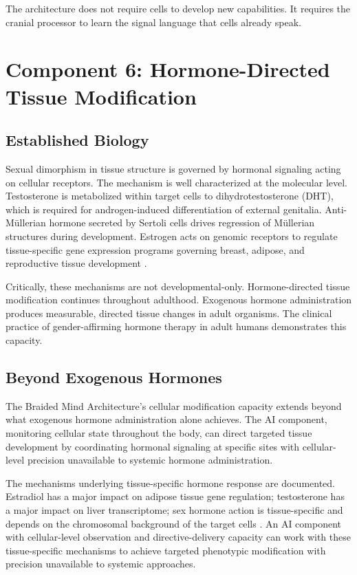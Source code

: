 \documentclass[12pt]{article}
\begin{document}
The architecture does not require cells to develop new capabilities. It requires the cranial processor to learn the signal language that cells already speak.

\section{Component 6: Hormone-Directed Tissue Modification}

\subsection{Established Biology}

Sexual dimorphism in tissue structure is governed by hormonal signaling acting on cellular receptors. The mechanism is well characterized at the molecular level. Testosterone is metabolized within target cells to dihydrotestosterone (DHT), which is required for androgen-induced differentiation of external genitalia. Anti-M\"{u}llerian hormone secreted by Sertoli cells drives regression of M\"{u}llerian structures during development. Estrogen acts on genomic receptors to regulate tissue-specific gene expression programs governing breast, adipose, and reproductive tissue development \cite{androgens_sex_development_2013}.

Critically, these mechanisms are not developmental-only. Hormone-directed tissue modification continues throughout adulthood. Exogenous hormone administration produces measurable, directed tissue changes in adult organisms. The clinical practice of gender-affirming hormone therapy in adult humans demonstrates this capacity.

\subsection{Beyond Exogenous Hormones}

The Braided Mind Architecture's cellular modification capacity extends beyond what exogenous hormone administration alone achieves. The AI component, monitoring cellular state throughout the body, can direct targeted tissue development by coordinating hormonal signaling at specific sites with cellular-level precision unavailable to systemic hormone administration.

The mechanisms underlying tissue-specific hormone response are documented. Estradiol has a major impact on adipose tissue gene regulation; testosterone has a major impact on liver transcriptome; sex hormone action is tissue-specific and depends on the chromosomal background of the target cells \cite{sex_hormones_tissue_2022}. An AI component with cellular-level observation and directive-delivery capacity can work with these tissue-specific mechanisms to achieve targeted phenotypic modification with precision unavailable to systemic approaches.
\end{document}
